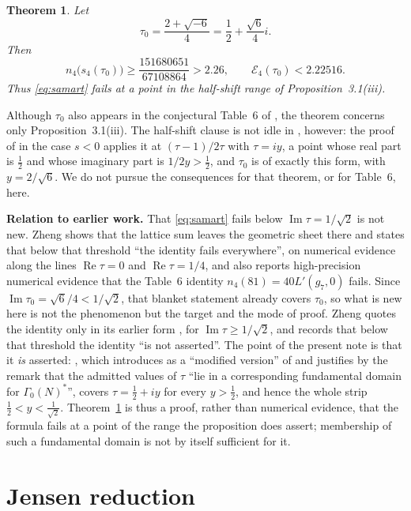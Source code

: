 \documentclass[11pt]{amsart}
\newtheorem{theorem}{Theorem}
\newcommand{\EK}{\mathcal E_4}
\renewcommand{\Re}{\operatorname{Re}}
\renewcommand{\Im}{\operatorname{Im}}
\begin{document}
\begin{theorem}\label{thm:main}
Let
\[
 \tau_0=\frac{2+\sqrt{-6}}4
       =\frac12+\frac{\sqrt6}{4}i.
\]
Then
\[
 n_4\bigl(s_4(\tau_0)\bigr)
 \ge \frac{151680651}{67108864}>2.26,
 \qquad
 \EK(\tau_0)<2.22516.
\]
Thus \eqref{eq:samart} fails at a point in the half-shift range of
Proposition~3.1(iii).
\end{theorem}

Although $\tau_0$ also appears in the conjectural Table~6 of
\cite{Samart2015}, the theorem concerns only Proposition~3.1(iii).
The half-shift clause is not idle in \cite{Samart2016}, however: the
proof of \cite[Thm.~1.2(iii)]{Samart2016} in the case $s<0$ applies it
at $(\tau-1)/2\tau$ with $\tau=iy$, a point whose real part is
$\frac12$ and whose imaginary part is $1/2y>\frac12$, and $\tau_0$ is
of exactly this form, with $y=2/\sqrt6$. We do not pursue the
consequences for that theorem, or for Table~6, here.

\medskip
\noindent
\textbf{Relation to earlier work.}
That \eqref{eq:samart} fails below $\Im\tau=1/\sqrt2$ is not new.
Zheng \cite[\S5]{Zheng2026} shows that the lattice sum leaves the
geometric sheet there and states that below that threshold ``the
identity fails everywhere'', on numerical evidence along the lines
$\Re\tau=0$ and $\Re\tau=1/4$, and also reports high-precision
numerical evidence that the Table~6 identity $n_4(81)=40L'(g_7,0)$
fails. Since $\Im\tau_0=\sqrt6/4<1/\sqrt2$, that blanket statement
already covers $\tau_0$, so what is new here is not the phenomenon but
the target and the mode of proof. Zheng quotes the identity only in its
earlier form \cite[Prop.~2.1(iii)]{Samart2013}, for
$\Im\tau\ge1/\sqrt2$, and records that below that threshold the
identity ``is not asserted''. The point of the present note is that it
\emph{is} asserted: \cite[Prop.~3.1(iii)]{Samart2016}, which
\cite{Samart2016} introduces as a ``modified version'' of
\cite[Prop.~2.1]{Samart2013} and justifies by the remark that the
admitted values of $\tau$ ``lie in a corresponding fundamental domain
for $\Gamma_0(N)^*$'', covers $\tau=\frac12+iy$ for every $y>\frac12$,
and hence the whole strip $\frac12<y<\frac1{\sqrt2}$.
Theorem~\ref{thm:main} is thus a proof, rather than numerical evidence,
that the formula fails at a point of the range the proposition does
assert; membership of such a fundamental domain is not by itself
sufficient for it.

\section{Jensen reduction}
\end{document}

